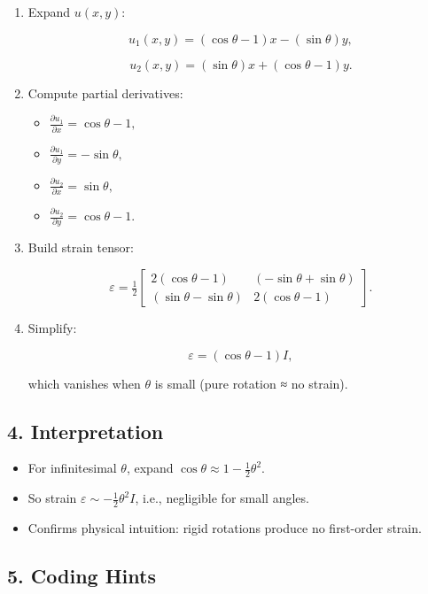 \documentclass[
  letterpaper,
  DIV=11,
  numbers=noendperiod]{scrreprt}
\providecommand{\tightlist}{%
  \setlength{\itemsep}{0pt}\setlength{\parskip}{0pt}}
\begin{document}
\begin{enumerate}
\def\labelenumi{\arabic{enumi}.}
\item
  Expand \(u(x,y)\):

  \[
  u_1(x,y) = (\cos\theta - 1)x - (\sin\theta)y,
  \]

  \[
  u_2(x,y) = (\sin\theta)x + (\cos\theta - 1)y.
  \]
\item
  Compute partial derivatives:

  \begin{itemize}
  \tightlist
  \item
    \(\frac{\partial u_1}{\partial x} = \cos\theta - 1,\)
  \item
    \(\frac{\partial u_1}{\partial y} = -\sin\theta,\)
  \item
    \(\frac{\partial u_2}{\partial x} = \sin\theta,\)
  \item
    \(\frac{\partial u_2}{\partial y} = \cos\theta - 1.\)
  \end{itemize}
\item
  Build strain tensor:

  \[
  \varepsilon = \tfrac{1}{2}\begin{bmatrix}
  2(\cos\theta - 1) & (-\sin\theta + \sin\theta) \\
  (\sin\theta - \sin\theta) & 2(\cos\theta - 1)
  \end{bmatrix}.
  \]
\item
  Simplify:

  \[
  \varepsilon = (\cos\theta - 1) I,
  \]

  which vanishes when \(\theta\) is small (pure rotation ≈ no strain).
\end{enumerate}

\subsection{4. Interpretation}\label{interpretation}

\begin{itemize}
\tightlist
\item
  For infinitesimal \(\theta\), expand
  \(\cos\theta \approx 1 - \tfrac{1}{2}\theta^2\).
\item
  So strain \(\varepsilon \sim -\tfrac{1}{2}\theta^2 I\), i.e.,
  negligible for small angles.
\item
  Confirms physical intuition: rigid rotations produce no first-order
  strain.
\end{itemize}

\subsection{5. Coding Hints}\label{coding-hints-2}
\end{document}
